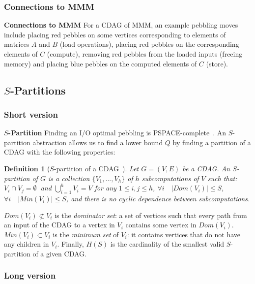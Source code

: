 \documentclass[sigplan,review,anonymous]{acmart}\settopmatter{printfolios=true,printccs=false,printacmref=false}
\newtheorem{defn}{Definition}
\newcommand{\macb}[1]{\textbf{\textsf{#1}}}
\begin{document}
\subsubsection{Connections to MMM}
\macb{Connections to MMM}
%
For a CDAG of MMM, an example pebbling moves include placing red pebbles on 
some vertices
corresponding to elements of matrices $A$ and $B$ (load operations), placing red
pebbles on the corresponding elements of $C$ (compute), removing red
pebbles from the loaded inputs (freeing memory) and placing blue pebbles on the
computed elements of $C$ (store). 

\subsection{$S$-Partitions}

\subsubsection{Short version}

\macb{$S$-Partition} Finding an I/O optimal pebbling is 
PSPACE-complete~\cite{redbluecomplete}. An $S$-partition abstraction allows us 
to find a lower bound $Q$ by finding a partition of a CDAG with the following 
properties:

\begin{defn}[$S$-partition of a CDAG~\cite{redblue}] \label{df:s-partition}
	Let $G = (V,E)$ be a CDAG. An $S$-partition of $G$ is a collection $\{V_1, 
	...,
	V_h\}$ of $h$ subcomputations of $ V$ such that:  $V_i \cap V_j
	=\emptyset\ $ and $\bigcup_{i=1}^{h} V_i=V$ for any $1 \le i,j \le h$,
	 $\forall i\quad |Dom(V_i)| \le S$,  $\forall i\quad
	|Min(V_i)| \le S$, and  there is no cyclic dependence between
	subcomputations.
\end{defn}

$Dom(V_i) \not \subset V_i$ is the \emph{dominator set}: a set of vertices such 
that
every path from an input of the CDAG to a vertex in $V_i$ contains some 
vertex in
$Dom(V_i)$.
%
$Min(V_i) \subset V_i$ is the \emph{minimum set} of $V_i$: it contains vertices
that do not have any children in $V_i$. 
%
%
Finally, $H(S)$ is the cardinality of the smallest valid $S$-partition of a
given CDAG.

\subsubsection{Long version}
\end{document}
